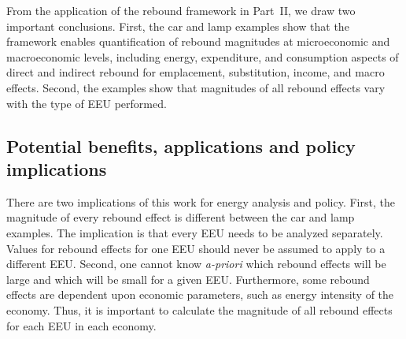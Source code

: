 \documentclass[12pt]{article}    %
\begin{document}
From the application of the rebound framework in Part~II, 
we draw two important conclusions.
First, the car and lamp examples show that
        the framework enables
        quantification of rebound magnitudes at microeconomic and macroeconomic levels, including 
        energy, expenditure, and consumption aspects of 
        direct and indirect rebound 
        for emplacement, substitution, income, and macro effects.
Second, the examples show that magnitudes of all rebound effects
        vary with the type of EEU performed.


\subsection*{Potential benefits, applications and policy implications}
\label{sec:benefits}

There are two implications of this work for energy analysis and policy.
First, 
the magnitude of every rebound effect is different between the car and lamp examples.
The implication is that every EEU needs to be analyzed separately. 
Values for rebound effects  
for one EEU should never be assumed to apply to a different EEU.
Second, 
one cannot know \emph{a-priori} which rebound effects
will be large and which will be small
for a given EEU.
Furthermore, some rebound effects are dependent upon economic parameters,
such as energy intensity of the economy.
Thus, it is important to calculate the magnitude of all rebound effects 
for each EEU in each economy.
\end{document}
